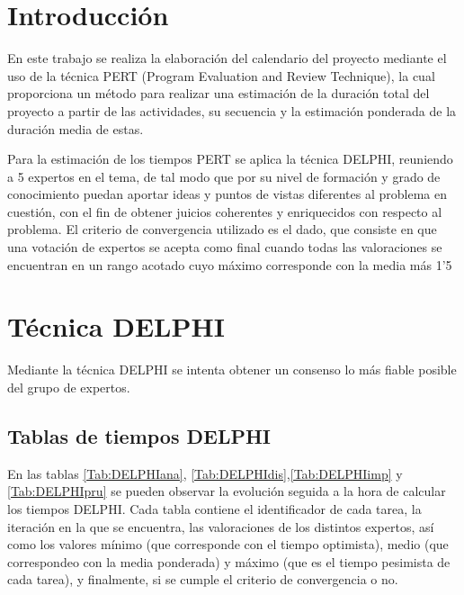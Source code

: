 \documentclass[11pt,a4paper,spanish,twoside]{report}
\begin{document}
\tableofcontents


\chapter*{Introducción}
En este trabajo se realiza la elaboración del calendario del proyecto
mediante el uso de la técnica PERT (Program Evaluation and Review Technique),
la cual proporciona un método para realizar una estimación de la duración
total del proyecto a partir de las actividades, su secuencia y la estimación
ponderada de la duración media de estas. 

Para la estimación de los tiempos PERT se aplica la técnica DELPHI, reuniendo
a 5 expertos en el tema, de tal modo que por su nivel de formación y grado de
conocimiento puedan aportar ideas y puntos de vistas diferentes al problema
en cuestión, con el fin de obtener juicios coherentes y enriquecidos con
respecto al problema. El criterio de convergencia utilizado es el dado, que
consiste en que una votación de expertos se acepta como final cuando todas
las valoraciones se encuentran en un rango acotado cuyo máximo corresponde
con la media más 1'5

\chapter{Técnica DELPHI}
Mediante la técnica DELPHI se intenta obtener un consenso lo más fiable
posible del grupo de expertos.
    
\section{Tablas de tiempos DELPHI}
En las tablas \ref{Tab:DELPHIana}, \ref{Tab:DELPHIdis},\ref{Tab:DELPHIimp} y
\ref{Tab:DELPHIpru} se
pueden observar la evolución seguida a la hora de calcular los tiempos
DELPHI. Cada tabla contiene el identificador de cada tarea, la iteración en
la que se encuentra, las valoraciones de los distintos expertos, así como los
valores mínimo (que corresponde con el tiempo optimista), medio (que
correspondeo con la media ponderada) y máximo (que es el tiempo pesimista de
cada tarea), y finalmente, si se cumple el criterio de convergencia o no.
\end{document}
